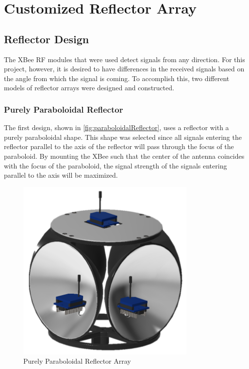 \chapter{Customized Reflector Array}
\label{ch: Chapter3}

\section{Reflector Design}
The XBee RF modules that were used detect signals from any direction. For this project, however, it is desired to have differences in the received signals based on the angle from which the signal is coming. To accomplish this, two different models of reflector arrays were designed and constructed. 

\subsection{Purely Paraboloidal Reflector}
The first design, shown in \autoref{fig:paraboloidalReflector}, uses a reflector with a purely paraboloidal shape. This shape was selected since all signals entering the reflector parallel to the axis of the reflector will pass through the focus of the paraboloid. By mounting the XBee such that the center of the antenna coincides with the focus of the paraboloid, the signal strength of the signals entering parallel to the axis will be maximized.
\begin{figure}
    \centering
    \includegraphics[width=3.5in]{figs/img/paraboloidalReflector.png}
    \caption{Purely Paraboloidal Reflector Array}
    \label{fig:paraboloidalReflector}
\end{figure}

